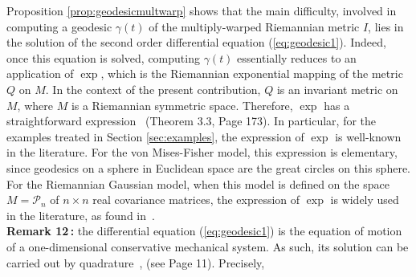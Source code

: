 \documentclass{svmult}
\begin{document}
Proposition \ref{prop:geodesicmultwarp} shows that the main difficulty, involved in computing a geodesic $\gamma(t)$ of the multiply-warped Riemannian metric $I$, lies in the solution of the second order differential equation (\ref{eq:geodesic1}). Indeed, once this equation is solved, computing $\gamma(t)$ essentially reduces to an application of $\exp$, which is the Riemannian exponential mapping of the metric $Q$ on $M$. In the context of the present contribution, $Q$ is an invariant metric on $M$, where $M$ is a Riemannian symmetric space. Therefore, $\exp$ has a straightforward expression~\cite{helgason} (Theorem 3.3, Page 173). In particular, for the examples treated in Section \ref{sec:examples}, the expression of $\exp$ is well-known in the literature. For the von Mises-Fisher model, this expression is elementary, since geodesics on a sphere in Euclidean space are the great circles on this sphere. For the Riemannian Gaussian model, when this model is defined on the space $M = \mathcal{P}_n$ of $n \times n$ real covariance matrices, the expression of $\exp$ is widely used in the literature, as found in~\cite{pennec2}. \\[0.1cm]
\textbf{Remark 12\,:} the differential equation (\ref{eq:geodesic1}) is the equation of motion of a one-dimensional conservative mechanical system. As such, its solution can be carried out by quadrature~\cite{gallavotti}, (see Page 11). Precisely, 
\end{document}
